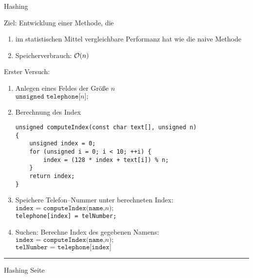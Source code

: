\begin{slide}{}
\normalsize

\begin{center}
Hashing
\end{center}
\vspace*{0.5cm}

\footnotesize
Ziel: Entwicklung einer Methode, die 
\begin{enumerate}
\item im statistischen Mittel vergleichbare Performanz hat wie die naive Methode
\item Speicherverbrauch: $\mathcal{O}(n)$
\end{enumerate}

Erster Versuch:
\begin{enumerate}
\item Anlegen eines Feldes der Gr\"o{\ss}e $n$ \\[0.3cm]
      \hspace*{1.3cm} $\texttt{unsigned telephone[}n\mathtt{];}$
\item Berechnung des Index
\begin{verbatim} 
unsigned computeIndex(const char text[], unsigned n) 
{
    unsigned index = 0;
    for (unsigned i = 0; i < 10; ++i) {
        index = (128 * index + text[i]) % n;
    }
    return index;
}
\end{verbatim}
\item Speichere Telefon--Nummer unter berechneten Index: \\[0.3cm]
      \hspace*{1.3cm} $\texttt{index = computeIndex(name,} n\mathtt{);}$ \\[0.3cm]
      \hspace*{1.3cm} \texttt{telephone[index] = telNumber;}
\item Suchen: Berechne Index des gegebenen Namens: \\[0.3cm]
      \hspace*{1.3cm} $\texttt{index = computeIndex(name,} n\mathtt{);}$ \\[0.3cm]
      \hspace*{1.3cm} $\texttt{telNumber = telephone[index]}$
\end{enumerate}

\vspace*{\fill}
\tiny \addtocounter{mypage}{1}
\rule{17cm}{1mm}
Hashing  \hspace*{\fill} Seite 
\end{slide}

